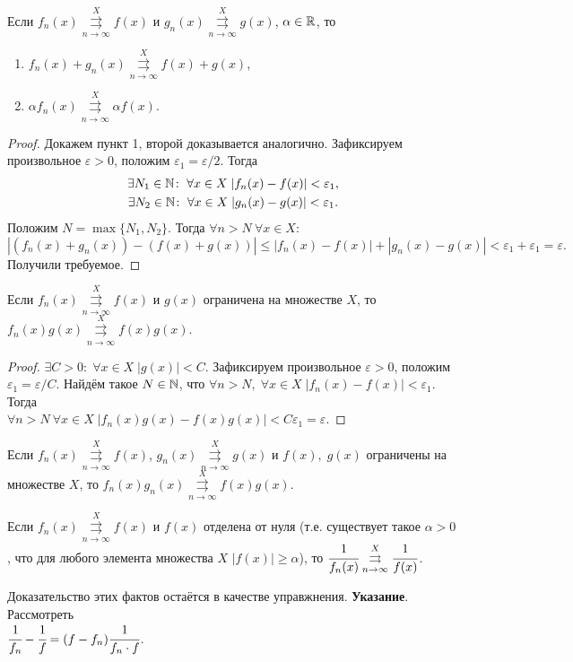 	\begin{Statement}
		Если $f_n(x) \overset{X}{\underset{n\to\infty}{\rightrightarrows}} f(x)$ и $g_n(x) \overset{X}{\underset{n\to\infty}{\rightrightarrows}} g(x)$, $\alpha \in \mathbb{R}$, то 
		\begin{enumerate}
			\item $f_n(x) + g_n(x) \overset{X}{\underset{n\to\infty}{\rightrightarrows}} f(x) + g(x)$,
			\item $\alpha f_n(x) \overset{X}{\underset{n\to\infty}{\rightrightarrows}} \alpha f(x)$.
		\end{enumerate}
	\end{Statement}
	\begin{proof}
		Докажем пункт 1, второй доказывается аналогично. Зафиксируем произвольное $\varepsilon > 0$, положим $\varepsilon_1 = \varepsilon / 2$. Тогда
		\begin{gather*}
			\exists N_1 \in \mathbb{N}\colon \; \forall x\in X\; |f_n(x) - f(x) | < \varepsilon_1,\\
			\exists N_2 \in \mathbb{N}\colon \; \forall x\in X\; |g_n(x) - g(x) | < \varepsilon_1.\\
		\end{gather*}
		Положим $N = \max\{N_1, N_2\}$. Тогда $\forall n > N\ \forall x \in X$:
		$$
			|(f_n(x) + g_n(x)) - (f(x) + g(x))| \leqslant |f_n(x) - f(x)| + |g_n(x) - g(x)| < \varepsilon_1 + \varepsilon_1 = \varepsilon.
		$$
		Получили требуемое.
	\end{proof}
	\begin{Statement}
		Если $f_n(x)\overset{X}{\underset{n\to\infty}{\rightrightarrows}} f(x)$ и $g(x)$ ограничена на множестве $X$, то\\ $f_n(x)g(x) \overset{X}{\underset{n\to\infty}{\rightrightarrows}} f(x) g(x)$.
	\end{Statement}
	\begin{proof}
		$\exists C>0\colon\; \forall x\in X\; |g(x)| < C$. Зафиксируем произвольное $\varepsilon > 0$, положим $\varepsilon_1 = \varepsilon/C$. Найдём такое $N\in \mathbb{N}$, что 
		$\forall n>N,\; \forall x\in X\; |f_n(x) - f(x)| < \varepsilon_1$. Тогда \\$\forall n >N\  \forall x\in X\; |f_n(x)g(x) - f(x)g(x)| < C\varepsilon_1 = \varepsilon$. 
	\end{proof}
	\begin{Comment}
		Если $f_n(x) \overset{X}{\underset{n\to\infty}{\rightrightarrows}} f(x)$, $g_n(x) \overset{X}{\underset{n\to\infty}{\rightrightarrows}} g(x)$ и $f(x),\; g(x)$ ограничены на множестве $X$, то $f_n(x)g_n(x)\overset{X}{\underset{n\to\infty}{\rightrightarrows}} f(x)g(x)$.
	\end{Comment}
	\begin{Comment}
		Если $f_n(x) \overset{X}{\underset{n\to\infty}{\rightrightarrows}} f(x)$ и $f(x)$ отделена от нуля (т.е. существует такое $\alpha>0$, что для любого элемента множества $X$ $|f(x)| \geqslant \alpha$), то $\cfrac{1}{f_n(x)} \overset{X}{\underset{n\to\infty}{\rightrightarrows}} \cfrac{1}{f(x)}$. 
	\end{Comment}
	Доказательство этих фактов остаётся в качестве управжнения. \textbf{Указание}. Рассмотреть \\$\cfrac{1}{f_n} - \cfrac{1}{f} = (f-f_n)\cfrac{1}{f_n\cdot f}$.

